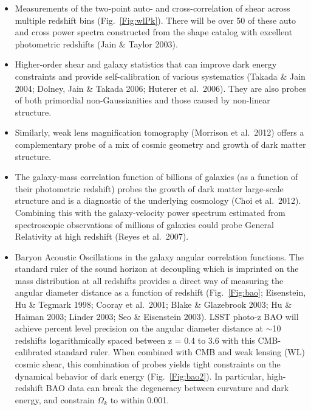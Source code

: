 \begin{itemize}
\item Measurements of the two-point auto- and cross-correlation of
  shear across multiple redshift bins (Fig.~\ref{Fig:wlPk}). There will be 
over 50 of these auto and cross power spectra constructed from the
shape catalog with excellent photometric redshifts
(Jain \& Taylor 2003).
\item Higher-order shear and galaxy statistics that can improve dark energy 
constraints and provide self-calibration of various systematics (Takada \& Jain 2004; 
Dolney, Jain \& Takada 2006; Huterer et al.~2006). They are also probes of both
primordial non-Gaussianities and those caused by non-linear structure.
\item Similarly, weak lens magnification tomography (Morrison et al.~2012) offers a 
complementary probe of a mix of cosmic geometry and growth of dark matter structure.
\item The galaxy-mass correlation function of billions of galaxies (as a function of their 
photometric redshift) probes the growth of dark matter large-scale structure and is a 
diagnostic of the underlying cosmology (Choi et al.~2012). Combining this with the 
galaxy-velocity power spectrum estimated from spectroscopic observations of millions of galaxies 
could probe General Relativity at high redshift (Reyes et al.~2007).
\item Baryon Acoustic Oscillations in the galaxy angular correlation functions.
The standard ruler of the sound horizon at decoupling which is imprinted on the mass 
distribution at all redshifts provides a direct way of measuring the angular diameter
distance as a function of redshift (Fig.~\ref{Fig:bao}; Eisenstein, Hu \& Tegmark 1998;
Cooray et al.~2001; Blake \& Glazebrook 2003; Hu \& Haiman 2003; Linder 2003; Seo \& 
Eisenstein 2003). LSST photo-z BAO will achieve percent level precision on the angular 
diameter distance at $\sim$10 redshifts logarithmically spaced between z = 0.4 to 3.6 
with this CMB-calibrated standard ruler. When combined with CMB 
and weak lensing (WL) cosmic shear, this combination of probes yields tight constraints on the 
dynamical behavior of dark energy (Fig.~\ref{Fig:bao2}). In particular, high-redshift BAO data can break 
the degeneracy between curvature and dark energy, and constrain $\Omega_k$ to within 
0.001.

\end{itemize}
